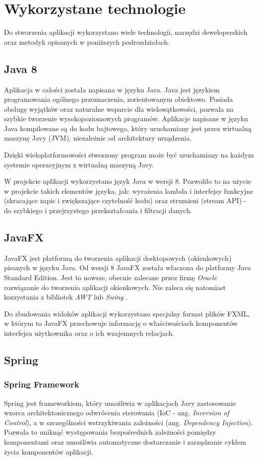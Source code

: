 \section{Wykorzystane technologie}
Do stworzenia aplikacji wykorzystano wiele technologii, narzędzi deweloperskich oraz metodyk opisanych w poniższych podrozdziałach.

\subsection{Java 8}
Aplikacja w całości została napisana w języku Java.
Java jest językiem programowania ogólnego przeznaczenia, zorientowanym obiektowo. Posiada obsługę wyjątków oraz naturalne wsparcie dla wielowątkowości, pozwala na szybkie tworzenie wysokopoziomowych programów. Aplikacje napisane w języku Java kompilowane są do kodu bajtowego, który uruchamiany jest przez wirtualną maszynę Javy (JVM), niezależnie od architektury urządzenia.

Dzięki wieloplatformowości stworzony program może być uruchamiany na każdym systemie operacyjnym z wirtualną maszyną Javy.

W projekcie aplikacji wykorzystano język Java w wersji 8. 
Pozwoliło to na użycie w projekcie takich elementów języka, jak: wyrażenia lambda i interfejsy funkcyjne (skracające zapis i zwiększające czytelność kodu) oraz strumieni (stream API) - do szybkiego i przejrzystego przekształcania i filtracji danych.

\subsection{JavaFX}
JavaFX jest platformą do tworzenia aplikacji desktopowych (okienkowych) pisanych w języku Java.
Od wersji 8 JavaFX została właczona do platformy Java Standard Edition.
Jest to nowsze, obecnie zalecane przez firmę {\it Oracle} rozwiązanie do tworzenia aplikacji okienkowych. Nie zaleca się natomiast korzystania z bibliotek {\it AWT} lub {\it Swing} \cite{javafx-replacing-swing}.

Do zbudowania widoków aplikacji wykorzystano specjalny format plików FXML, w którym to JavaFX przechowuje informację o właściwościach komponentów interfejsu użytkownika oraz o ich wzajemnych relacjach.

\subsection{Spring}
\subsubsection{Spring Framework}
Spring jest frameworkiem, który umożliwia w aplikacjach Javy zastosowanie wzorca architektonicznego odwrócenia sterowania (IoC - ang. {\it Inversion of Control}), a w szczególności wstrzykiwania zależności (ang. {\it Dependency Injection}). Pozwala to uniknąć występowania bezpośrednich zależności pomiędzy komponentami oraz umożliwia automatyczne dostarczanie i zarządzanie cyklem życia komponentów aplikacji.

